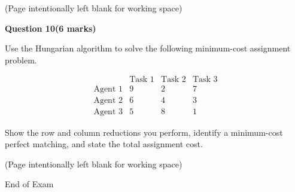 \documentclass[12pt,letterpaper]{article}
\newcommand{\marksbox}[1]{%
  \vfill
  \begin{flushright}
    \fbox{\parbox[c][1.1cm][c]{1.3cm}{\centering #1}}
  \end{flushright}
}
\newcommand{\questiontitle}[2]{%
  \textbf{Question #1}\hfill\textbf{(#2 marks)}
}
\newcommand{\workingpage}{%
  \newpage
  \begin{center}
    (Page intentionally left blank for working space)
  \end{center}
}
\begin{document}
\marksbox{6}

\workingpage
\newpage

\questiontitle{10}{6}

Use the Hungarian algorithm to solve the following minimum-cost assignment
problem.

\[
\begin{array}{c|ccc}
      & \text{Task 1} & \text{Task 2} & \text{Task 3} \\
\hline
\text{Agent 1} & 9 & 2 & 7 \\
\text{Agent 2} & 6 & 4 & 3 \\
\text{Agent 3} & 5 & 8 & 1
\end{array}
\]

Show the row and column reductions you perform, identify a minimum-cost
perfect matching, and state the total assignment cost.

\marksbox{6}

\workingpage

\vfill
\begin{center}
  End of Exam
\end{center}
\end{document}
